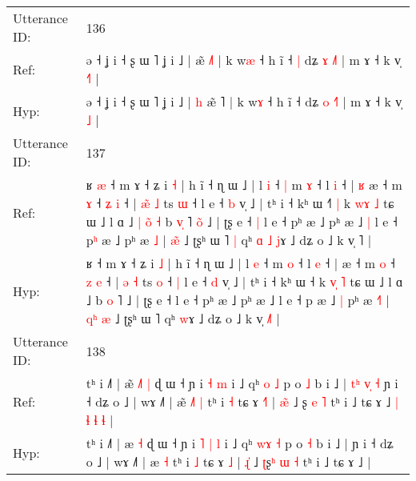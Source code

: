 \documentclass[10pt]{article}
\DeclareRobustCommand{\hl}[1]{{\textcolor{red}{#1}}}
\begin{document}
\begin{longtable}{ll}
 \\
\midrule
Utterance ID: & 136 \\
Ref: & ə ˧ ʝ i ˧ ʂ ɯ ˥ ʝ i ˩ |\hl{}\hl{} æ̃ \hl{˩}˥ | k w\hl{æ} ˧ h ĩ ˧\hl{ }\hl{|} dʑ \hl{ɤ} \hl{˩}˥ | m ɤ ˧ k v̩ \hl{˧}\hl{˥} |
 \\
Hyp: & ə ˧ ʝ i ˧ ʂ ɯ ˥ ʝ i ˩ |\hl{ }\hl{h} æ̃ \hl{}˥ | k w\hl{ɤ} ˧ h ĩ ˧\hl{}\hl{} dʑ \hl{o} \hl{˧}˥ | m ɤ ˧ k v̩ \hl{}\hl{˩} |
 \\
\midrule
Utterance ID: & 137 \\
Ref: & ʁ\hl{ }\hl{æ} ˧ m ɤ ˧ ʑ i \hl{˧} | h ĩ ˧ ɳ ɯ ˩ | l \hl{i} ˧\hl{ }\hl{|} m \hl{ɤ} ˧ l \hl{i} ˧ |\hl{ }\hl{ʁ} æ ˧ m \hl{ɤ} ˧ \hl{ʑ} \hl{i} ˧ | \hl{æ}\hl{̃} \hl{˩} ts \hl{ɯ} ˧\hl{}\hl{} l e ˧ \hl{b} v̩ ˩ | tʰ i ˧ kʰ ɯ ˧\hl{˥}\hl{ }\hl{|} k \hl{w}\hl{ɤ} \hl{˩} tɕ ɯ ˩ l ɑ ˩\hl{ }\hl{|}\hl{ }\hl{o}\hl{̃}\hl{ }\hl{˧} b \hl{v}\hl{̩} ˥\hl{ }\hl{o}\hl{̃} ˩ | ʈʂ e ˧\hl{ }\hl{|} l e ˧ pʰ æ ˩ pʰ æ ˩\hl{ }\hl{|} l e ˧ p\hl{ʰ} æ ˩\hl{}\hl{} pʰ æ \hl{}\hl{˩} | \hl{}\hl{}\hl{æ}\hl{̃} ˩ ʈʂʰ ɯ ˥\hl{ }\hl{|} qʰ\hl{ }\hl{ɑ}\hl{ }\hl{˩} \hl{j}ɤ ˩ dʑ o ˩ k v̩ \hl{}˥ |
 \\
Hyp: & ʁ\hl{}\hl{} ˧ m ɤ ˧ ʑ i \hl{˩} | h ĩ ˧ ɳ ɯ ˩ | l \hl{e} ˧\hl{}\hl{} m \hl{o} ˧ l \hl{e} ˧ |\hl{}\hl{} æ ˧ m \hl{o} ˧ \hl{z} \hl{e} ˧ | \hl{}\hl{ə} \hl{˧} ts \hl{o} ˧\hl{ }\hl{|} l e ˧ \hl{d} v̩ ˩ | tʰ i ˧ kʰ ɯ ˧\hl{}\hl{}\hl{} k \hl{v}\hl{̩} \hl{˥} tɕ ɯ ˩ l ɑ ˩\hl{}\hl{}\hl{}\hl{}\hl{}\hl{}\hl{} b \hl{}\hl{o} ˥\hl{}\hl{}\hl{} ˩ | ʈʂ e ˧\hl{}\hl{} l e ˧ pʰ æ ˩ pʰ æ ˩\hl{}\hl{} l e ˧ p\hl{} æ ˩\hl{ }\hl{|} pʰ æ \hl{˧}\hl{˥} | \hl{q}\hl{ʰ}\hl{ }\hl{æ} ˩ ʈʂʰ ɯ ˥\hl{}\hl{} qʰ\hl{}\hl{}\hl{}\hl{} \hl{w}ɤ ˩ dʑ o ˩ k v̩ \hl{˩}˥ |
 \\
\midrule
Utterance ID: & 138 \\
Ref: & tʰ i ˩˥ | æ\hl{̃}\hl{ }\hl{˩}\hl{˥} \hl{|} ɖ ɯ ˧ ɲ i\hl{}\hl{} \hl{˧} \hl{m} i ˩ qʰ \hl{}\hl{o} \hl{˩} p o \hl{˩} b i ˩ |\hl{ }\hl{t}\hl{ʰ}\hl{ }\hl{v}\hl{̩}\hl{ }\hl{˧} ɲ i ˧ dʑ o ˩ | wɤ ˩˥ | æ\hl{̃}\hl{ }\hl{˩}\hl{˥} \hl{|} tʰ i \hl{˧} tɕ ɤ \hl{˧}\hl{˥} | \hl{æ}\hl{̃} ˩ \hl{}ʂ\hl{} \hl{e} \hl{˥} tʰ i ˩ tɕ ɤ ˩\hl{ }\hl{|}\hl{ }\hl{ɬ}\hl{ }\hl{ɬ}\hl{ }\hl{ɬ} |
 \\
Hyp: & tʰ i ˩˥ | æ\hl{}\hl{}\hl{}\hl{} \hl{˧} ɖ ɯ ˧ ɲ i\hl{ }\hl{˥} \hl{|} \hl{l} i ˩ qʰ \hl{w}\hl{ɤ} \hl{˧} p o \hl{˧} b i ˩ |\hl{}\hl{}\hl{}\hl{}\hl{}\hl{}\hl{}\hl{} ɲ i ˧ dʑ o ˩ | wɤ ˩˥ | æ\hl{}\hl{}\hl{}\hl{} \hl{˧} tʰ i \hl{˩} tɕ ɤ \hl{}\hl{˩} | \hl{ɻ}\hl{̍} ˩ \hl{ʈ}ʂ\hl{ʰ} \hl{ɯ} \hl{˧} tʰ i ˩ tɕ ɤ ˩\hl{}\hl{}\hl{}\hl{}\hl{}\hl{}\hl{}\hl{} |
 \\

\end{longtable}
\end{document}
